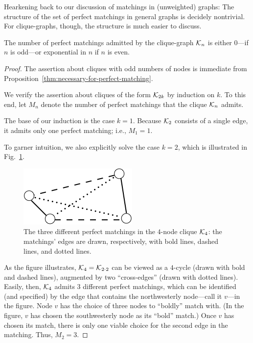Hearkening back to our discussion of matchings in (unweighted) graphs:
The structure of the set of perfect matchings in general graphs is
decidely nontrivial.  For clique-graphs, though, the structure is much
easier to discuss.

\begin{prop}
\label{thm:perfect-matchings-clique}
The number of perfect matchings admitted by the clique-graph $\mbox{$\cal K$}_n$ is
either $0$---if $n$ is odd---or exponential in $n$ if $n$ is even.
\end{prop}

\begin{proof}
The assertion about cliques with odd numbers of nodes is immediate
from Proposition~\ref{thm:necessary-for-perfect-matching}.

We verify the assertion about cliques of the form $\mbox{$\cal K$}_{2k}$ by
induction on $k$.  To this end, let $M_n$ denote the number of perfect
matchings that the clique $\mbox{$\cal K$}_n$ admits.

The base of our induction is the case $k=1$.  Because $\mbox{$\cal K$}_{2}$
consists of a single edge, it admits only one perfect matching; i.e.,
$M_1 = 1$.

To garner intuition, we also explicitly solve the case $k=2$, which is
illustrated in Fig.~\ref{fig:AllPerfectMatchings}.
\begin{figure}[hbt]
\begin{center}
       \includegraphics[scale=0.55]{FiguresGraph/perfectmatchingAll}
       \caption{The three different perfect matchings in the $4$-node
         clique $\mbox{$\cal K$}_4$: the matchings' edges are drawn, respectively,
         with bold lines, dashed lines, and dotted lines.}
  \label{fig:AllPerfectMatchings}
\end{center}
\end{figure}
As the figure illustrates, $\mbox{$\cal K$}_4 = \mbox{$\cal K$}_{2 \cdot 2}$ can be viewed as a
$4$-cycle (drawn with bold and dashed lines), augmented by two
``cross-edges'' (drawn with dotted lines).  Easily, then, $\mbox{$\cal K$}_4$
admits $3$ different perfect matchings, which can be identified (and
specified) by the edge that contains the northwesterly node---call it
$v$---in the figure.  Node $v$ has the choice of three nodes to
``boldly'' match with. (In the figure, $v$ has chosen the
southwesterly node as its ``bold'' match.)  Once $v$ has chosen its
match, there is only one viable choice for the second edge in the
matching.  Thus, $M_2=3$.


\end{proof}
